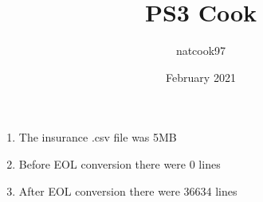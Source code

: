 \documentclass{article}
\title{PS3 Cook}
\author{natcook97 }
\date{February 2021}
\begin{document}
\maketitle

\begin{enumerate}
    \item The insurance .csv file was 5MB
    \item Before EOL conversion there were 0 lines
    \item After EOL conversion there were 36634 lines
\end{enumerate}
\end{document}
